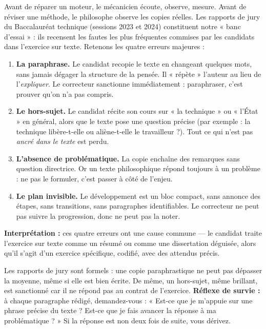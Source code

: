 \documentclass[11pt]{article}
\begin{document}
\begin{experience}
Avant de réparer un moteur, le mécanicien écoute, observe, mesure. Avant de réviser une méthode, le philosophe observe les copies réelles. Les rapports de jury du Baccalauréat technique (sessions 2023 et 2024) constituent notre « banc d'essai » : ils recensent les fautes les plus fréquentes commises par les candidats dans l'exercice sur texte. Retenons les quatre erreurs majeures :

\begin{enumerate}
\item \textbf{La paraphrase.} Le candidat recopie le texte en changeant quelques mots, sans jamais dégager la structure de la pensée. Il « répète » l'auteur au lieu de l'\emph{expliquer}. Le correcteur sanctionne immédiatement : paraphraser, c'est prouver qu'on n'a pas compris.
\item \textbf{Le hors-sujet.} Le candidat récite son cours sur « la technique » ou « l'État » en général, alors que le texte pose une question précise (par exemple : la technique libère-t-elle ou aliène-t-elle le travailleur ?). Tout ce qui n'est pas \emph{ancré dans le texte} est perdu.
\item \textbf{L'absence de problématique.} La copie enchaîne des remarques sans question directrice. Or un texte philosophique répond toujours à un problème : ne pas le formuler, c'est passer à côté de l'enjeu.
\item \textbf{Le plan invisible.} Le développement est un bloc compact, sans annonce des étapes, sans transitions, sans paragraphes identifiables. Le correcteur ne peut pas suivre la progression, donc ne peut pas la noter.
\end{enumerate}

\textbf{Interprétation :} ces quatre erreurs ont une cause commune — le candidat traite l'exercice sur texte comme un résumé ou comme une dissertation déguisée, alors qu'il s'agit d'un exercice spécifique, codifié, avec des attendus précis.
\end{experience}

\begin{attention}
Les rapports de jury sont formels : une copie paraphrastique ne peut pas dépasser la moyenne, même si elle est bien écrite. De même, un hors-sujet, même brillant, est sanctionné car il ne répond pas au contrat de l'exercice. \textbf{Réflexe de survie :} à chaque paragraphe rédigé, demandez-vous : « Est-ce que je m'appuie sur une phrase précise du texte ? Est-ce que je fais avancer la réponse à ma problématique ? » Si la réponse est non deux fois de suite, vous dérivez.
\end{attention}
\end{document}
